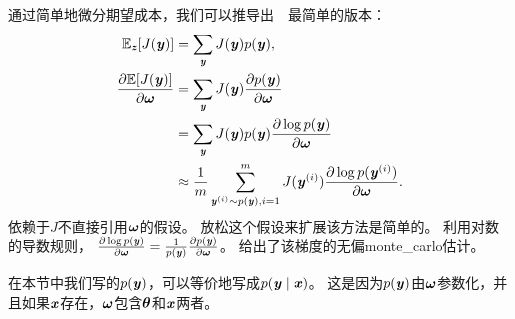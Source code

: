 通过简单地微分期望成本，我们可以推导出~~最简单的版本：
\begin{align}
 \SetE_{\Vz}[J(\Vy)] &= \sum_{\Vy} J(\Vy) p(\Vy), \\
 \frac{\partial \SetE[J(\Vy)]}{\partial \Vomega} &= \sum_{\Vy} J(\Vy)
 \frac{\partial p(\Vy)}{\partial \Vomega} \label{eq:sum_exp} \\
 &=  \sum_{\Vy} J(\Vy) p(\Vy) \frac{\partial\log p(\Vy)}{\partial \Vomega} 
 \label{eq:sum_log} \\
 & \approx \frac{1}{m} \sum_{\Vy^{(i)} \sim p(\Vy), i=1}^m 
 J(\Vy^{(i)}) \frac{\partial\log p(\Vy^{(i)})}{\partial \Vomega}. \label{eq:sum_prob}
\end{align}
依赖于$J$不直接引用$\Vomega$的假设。
放松这个假设来扩展该方法是简单的。
利用对数的导数规则，
$\frac{\partial\log p(\Vy)}{\partial \Vomega} = \frac{1}{p(\Vy)}
\frac{\partial p(\Vy)}{\partial \Vomega}$。
给出了该梯度的无偏\gls{monte_carlo}估计。


在本节中我们写的$p(\Vy)$，可以等价地写成$p(\Vy  \mid  \Vx)$。
这是因为$p(\Vy)$由$\Vomega$参数化，并且如果$\Vx$存在，$\Vomega$包含$\Vtheta$和$\Vx$两者。

